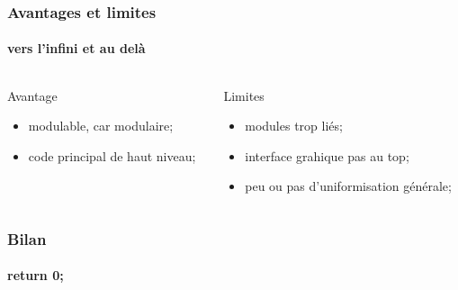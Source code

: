 \documentclass{beamer}
\begin{document}
    \begin{frame}
    \frametitle{Avantages et limites}
    \framesubtitle{vers l'infini et au delà}
        \begin{columns}[c] %
            \begin{column}{5.5cm} %
                \begin{exampleblock}{Avantage}
                    \begin{itemize}
                        \item modulable, car modulaire;
                        \item code principal de haut niveau;
                    \end{itemize}
                \end{exampleblock}
            \end{column}
            \begin{column}{5.5cm} %
                \begin{alertblock}{Limites}
                    \begin{itemize}
                        \item modules trop liés;
                        \item interface grahique pas au top; 
                        \item peu ou pas d'uniformisation générale;
                    \end{itemize}
                \end{alertblock}
            \end{column}
        \end{columns}
    \end{frame}


    \begin{frame}
    \frametitle{Bilan}
    \framesubtitle{return 0;}
    \end{frame}



\end{document}
